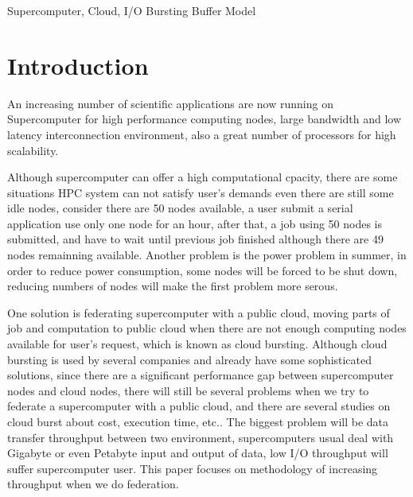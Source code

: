 \documentclass[JIP,draft]{ipsj}
\begin{document}
\begin{keyword}
Supercomputer, Cloud, I/O Bursting Buffer Model
\end{keyword}

\maketitle

\section{Introduction}
An increasing number of scientific applications are now running on Supercomputer for high performance computing nodes, large bandwidth and low latency interconnection environment, also a great number of processors for high scalability.

Although supercomputer can offer a high computational cpacity, there are some situations HPC system can not satisfy user's demands even there are still some idle nodes, consider there are 50 nodes available, a user submit a serial application use only one node for an hour, after that, a job using 50 nodes is submitted, and have to wait until previous job finished although there are 49 nodes remainning available.
Another problem is the power problem in summer, in order to reduce power consumption, some nodes will be forced to be shut down, reducing numbers of nodes will make the first problem more serous.

One solution is federating supercomputer with a public cloud, moving parts of job and computation to public cloud when there are not enough computing nodes available for user's request, which is known as cloud bursting.
Although cloud bursting is used by several companies and already have some sophisticated solutions\cite{Eucalyptus,stratos,Seagull}, since there are a significant performance gap between supercomputer nodes and cloud nodes, there will still be several problems when we try to federate a supercomputer with a public cloud, and there are several studies on cloud burst about cost\cite{Seagull}, execution time\cite{time_and_cost}, etc..
The biggest problem will be data transfer throughput between two environment, supercomputers usual deal with Gigabyte or even Petabyte input and output of data, low I/O throughput will suffer supercomputer user. This paper focuses on methodology of increasing throughput when we do federation.
\end{document}

